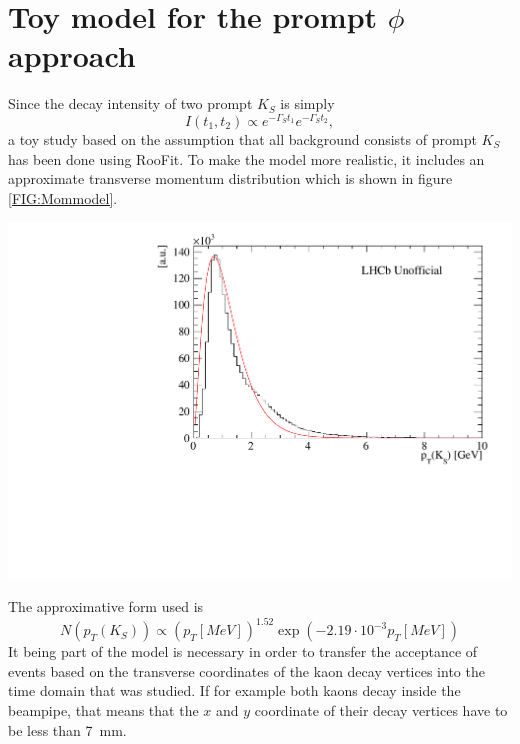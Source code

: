 \section{Toy model for the prompt $\phi$ approach}
Since the decay intensity of two prompt $K_S$ is simply 
\begin{equation}
I(t_1,t_2) \propto e^{-\Gamma_S t_1}e^{-\Gamma_S t_2}, 
\end{equation} 
a toy study based on the assumption that all background consists of prompt $K_S$ has been done using RooFit. To make the model more realistic, it includes an approximate transverse momentum distribution which is shown in figure \ref{FIG:Mommodel}. 

\begin{center}
\includegraphics[height=.48\textwidth]{figs/mommodel.pdf}
\label{FIG:Mommodel}
\end{center}

The approximative form used is
\begin{equation}
N(p_T(K_S)) \propto 
(p_T[MeV])^{1.52}\exp\left(-2.19\cdot10^{-3}p_T[MeV]\right) 
\end{equation}
It being part of the model is necessary in order to transfer the acceptance of events based on the transverse coordinates of the kaon decay vertices into the time domain that was studied. If for example both kaons decay inside the beampipe, that means that the $x$ and $y$ coordinate of their decay vertices have to be less than \SI{7}{mm}.

